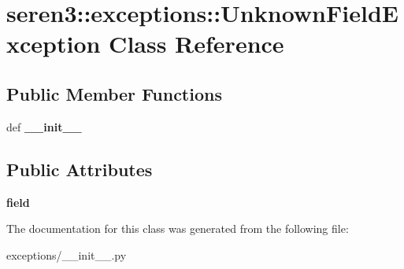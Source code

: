 \hypertarget{classseren3_1_1exceptions_1_1UnknownFieldException}{
\section{seren3::exceptions::UnknownFieldException Class Reference}
\label{classseren3_1_1exceptions_1_1UnknownFieldException}
}
\subsection*{Public Member Functions}
\begin{DoxyCompactItemize}
\item 
\hypertarget{classseren3_1_1exceptions_1_1UnknownFieldException_aaaa897422c3619a0741e4140a746d299}{
def {\bfseries \_\-\_\-init\_\-\_\-}}
\label{classseren3_1_1exceptions_1_1UnknownFieldException_aaaa897422c3619a0741e4140a746d299}

\end{DoxyCompactItemize}
\subsection*{Public Attributes}
\begin{DoxyCompactItemize}
\item 
\hypertarget{classseren3_1_1exceptions_1_1UnknownFieldException_afb24fc5d09aa73dcb28b360a5e995ac2}{
{\bfseries field}}
\label{classseren3_1_1exceptions_1_1UnknownFieldException_afb24fc5d09aa73dcb28b360a5e995ac2}

\end{DoxyCompactItemize}


The documentation for this class was generated from the following file:\begin{DoxyCompactItemize}
\item 
exceptions/\_\-\_\-init\_\-\_\-.py\end{DoxyCompactItemize}
